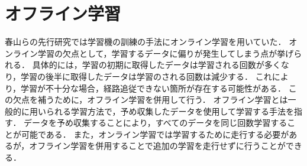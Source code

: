 \newpage
\section{オフライン学習}
春山らの先行研究では学習機の訓練の手法にオンライン学習を用いていた．
オンライン学習の欠点として，学習するデータに偏りが発生してしまう点が挙げられる．
具体的には，学習の初期に取得したデータは学習される回数が多くなり，学習の後半に取得したデータは学習のされる回数は減少する．
これにより，学習が不十分な場合，経路追従できない箇所が存在する可能性がある．
この欠点を補うために，オフライン学習を併用して行う．
オフライン学習とは一般的に用いられる学習方法で，予め収集したデータを使用して学習する手法を指す．
データを予め収集することにより，すべてのデータを同じ回数学習することが可能である．
また，オンライン学習では学習するために走行する必要があるが，オフライン学習を併用することで追加の学習を走行せずに行うことができる．